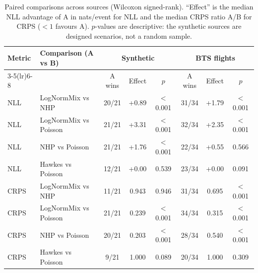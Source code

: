 \begin{table}[t]
\centering\small
\caption{Paired comparisons across sources (Wilcoxon signed-rank). ``Effect'' is the median NLL advantage of A in nats/event for NLL and the median CRPS ratio A/B for CRPS ($<1$ favours A). $p$-values are descriptive: the synthetic sources are designed scenarios, not a random sample.}
\label{tab:paired}
\begin{tabular}{llcccccc}
\toprule
Metric & Comparison (A vs B) & \multicolumn{3}{c}{Synthetic} & \multicolumn{3}{c}{BTS flights} \\
\cmidrule(lr){3-5}\cmidrule(lr){6-8}
 & & A wins & Effect & $p$ & A wins & Effect & $p$ \\
\midrule
NLL & LogNormMix vs NHP & 20/21 & +0.89 & $<$0.001 & 31/34 & +1.79 & $<$0.001 \\
NLL & LogNormMix vs Poisson & 21/21 & +3.31 & $<$0.001 & 32/34 & +2.35 & $<$0.001 \\
NLL & NHP vs Poisson & 21/21 & +1.76 & $<$0.001 & 22/34 & +0.55 & 0.566 \\
NLL & Hawkes vs Poisson & 12/21 & +0.00 & 0.539 & 23/34 & +0.00 & 0.091 \\
\midrule
CRPS & LogNormMix vs NHP & 11/21 & 0.943 & 0.946 & 31/34 & 0.695 & $<$0.001 \\
CRPS & LogNormMix vs Poisson & 21/21 & 0.239 & $<$0.001 & 34/34 & 0.315 & $<$0.001 \\
CRPS & NHP vs Poisson & 20/21 & 0.203 & $<$0.001 & 28/34 & 0.540 & $<$0.001 \\
CRPS & Hawkes vs Poisson & 9/21 & 1.000 & 0.089 & 20/34 & 1.000 & 0.309 \\
\bottomrule
\end{tabular}
\end{table}
